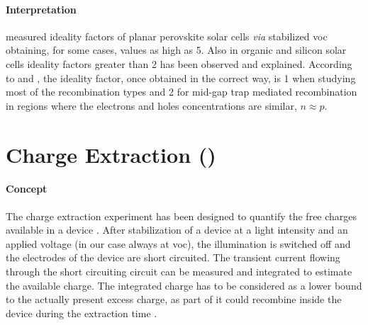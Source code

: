 		\paragraph{Interpretation} %
		 measured ideality factors of planar perovskite solar cells \textit{via} stabilized \gls{voc} obtaining, for some cases, values as high as 5.
		Also in organic \cite{Kirchartz2011,Kirchartz2012} and silicon solar cells \cite{Breitenstein2006} ideality factors greater than 2 has been observed and explained.
		According to  and , the ideality factor, once obtained in the correct way, is 1 when studying most of the recombination types and 2 for mid-gap trap mediated recombination in regions where the electrons and holes concentrations are similar, $n \approx p$.

\section{Charge Extraction ()}

	\paragraph{Concept} The charge extraction experiment has been designed to quantify the free charges available in a device \cite{Duffy2000,Barnes2011}.
	After stabilization of a device at a light intensity and an applied voltage (in our case always at \gls{voc}), the illumination is switched off and the electrodes of the device are short circuited.
	The transient current flowing through the short circuiting circuit can be measured and integrated to estimate the available charge.
	The integrated charge has to be considered as a lower bound to the actually present excess charge, as part of it could recombine inside the device during the extraction time \cite{ORegan2005}.

